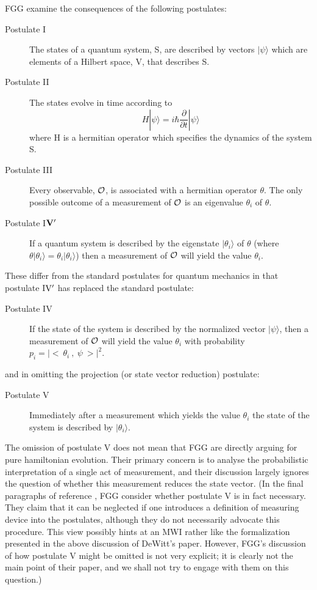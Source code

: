 \documentclass[aps,pra,12pt]{revtex4}
\def\ket#1{| #1\rangle}
\begin{document}
FGG examine the consequences of the following postulates:
\begin{description}
\item[Postulate I] The states of a quantum system, S, are described by vectors
$\ket{\psi}$ which are elements of a Hilbert space, V, that describes
S.
\item[Postulate II] The states evolve in time according to
\begin{equation}
H \ket{\psi} = i \hbar \frac{ \partial }{\partial t} \ket{\psi}
\end{equation}
where H is a hermitian operator which specifies the dynamics of the
system S.
\item[Postulate III]
Every observable, ${\cal O}$, is associated with a hermitian operator
$\theta$.  The only possible outcome of a measurement of ${\cal O}$ is
an eigenvalue $\theta_i$ of $\theta$.
\item[Postulate I${\bf V}^{\prime}$]
If a quantum system is described by the eigenstate $\ket{\theta_i}$ of
$\theta$ (where \mbox{$\theta \ket{\theta_i} = \theta_i \ket{\theta_i}$)}
then a measurement of ${\cal O}$ will yield the value $\theta_i$.
\end{description} 
These differ from the standard postulates for quantum mechanics in
that postulate I${\rm V}^{\prime}$ has replaced the standard
postulate:
\begin{description}
\item[Postulate IV] If the state of the system is 
described by the normalized vector $\ket{\psi}$, then a measurement of
${\cal O}$ will yield the value $\theta_i$ with probability $p_i = |
<~\theta_i ~,~ \psi ~> |^2$.
\end{description} 
and in omitting the projection (or state vector reduction) postulate:
\begin{description}
\item[Postulate V]
Immediately after a measurement which yields the value $\theta_i$ the
state of the system is described by $\ket{\theta_i}$.
\end{description} 

The omission of postulate V does not mean that FGG are directly
arguing for pure hamiltonian evolution.  Their primary concern is to
analyse the probabilistic interpretation of a single act of
measurement, and their discussion largely ignores the question of
whether this measurement reduces the state vector.  (In the final
paragraphs of reference \cite{fgg}, FGG consider whether postulate V
is in fact necessary.  They claim that it can be neglected if one
introduces a definition of measuring device into the postulates,
although they do not necessarily advocate this procedure.  This view
possibly hints at an MWI rather like the formalization presented in
the above discussion of DeWitt's paper.  However, FGG's discussion of
how postulate V might be omitted is not very explicit; it is clearly
not the main point of their paper, and we shall not try to engage with
them on this question.)
\end{document}
